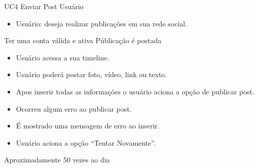 \casoDeUso
{UC4}
{Enviar Post}
{Usuário}
{
\begin{itemize}
	\item Usuário: deseja realizar publicações em sua rede social.
\end{itemize}

}
{Ter uma conta válida e ativa}
{Públicação é postada}
{
\begin{itemize}
\item Usuário acessa a sua timeline.
\item Usuário poderá postar foto, vídeo, link ou texto.
\item Apos inserir todas as informações o usuário aciona a opção de publicar post.
\end{itemize}
}
{
\begin{itemize}
\item Ocorreu algum erro ao publicar post.
\item É mostrado uma mensagem de erro ao inserir.
\item Usuário aciona a opção “Tentar Novamente”.
\end{itemize}
}
{Aproximadamente 50 vezes ao dia}
{

}

